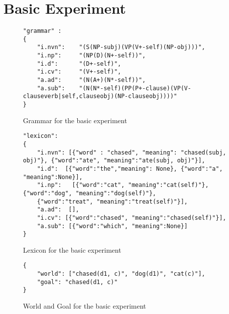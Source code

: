 \section{Basic Experiment}

\begin{figure}[h]
\caption{Grammar for the basic experiment}
\begin{lstlisting}
"grammar" :
{
    "i.nvn":    "(S(NP-subj)(VP(V+-self)(NP-obj)))",
    "i.np":     "(NP(D)(N+-self))",
    "i.d":      "(D+-self)",
    "i.cv":     "(V+-self)",
    "a.ad":     "(N(A+)(N*-self))",
    "a.sub":    "(N(N*-self)(PP(P+-clause)(VP(V-clauseverb|self,clauseobj)(NP-clauseobj))))"
}
\end{lstlisting}
\end{figure}

\begin{figure}[h]
\caption{Lexicon for the basic experiment}
\begin{lstlisting}
"lexicon":
{
    "i.nvn": [{"word" : "chased", "meaning": "chased(subj, obj)"}, {"word":"ate", "meaning":"ate(subj, obj)"}],
    "i.d":  [{"word":"the","meaning": None}, {"word":"a", "meaning":None}],
    "i.np":   [{"word":"cat", "meaning":"cat(self)"}, {"word":"dog", "meaning":"dog(self)"}, 
    {"word":"treat", "meaning":"treat(self)"}],
    "a.ad":  [],
    "i.cv": [{"word":"chased", "meaning":"chased(self)"}],
    "a.sub": [{"word":"which", "meaning":None}]
}
\end{lstlisting}
\end{figure}

\begin{figure}[h]
\caption{World and Goal for the basic experiment}
\begin{lstlisting}
{
    "world": ["chased(d1, c)", "dog(d1)", "cat(c)"],
    "goal": "chased(d1, c)"
}
\end{lstlisting}
\end{figure}

